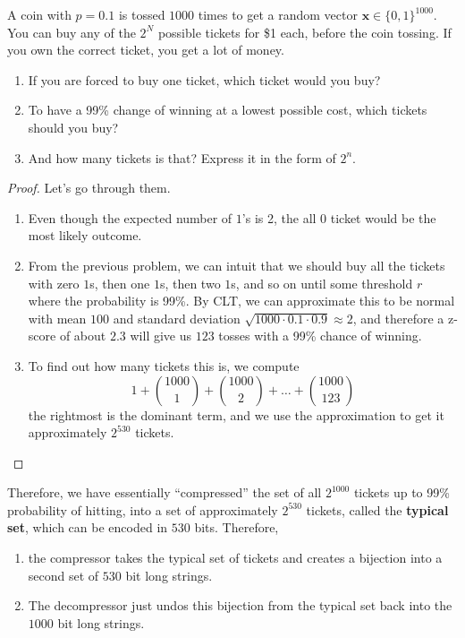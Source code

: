 \documentclass{article}
\begin{document}
    \begin{exercise}
      A coin with $p = 0.1$ is tossed $1000$ times to get a random vector $\mathbf{x} \in \{0, 1\}^{1000}$. You can buy any of the $2^N$ possible tickets for \$1 each, before the coin tossing. If you own the correct ticket, you get a lot of money. 
      \begin{enumerate}
        \item If you are forced to buy one ticket, which ticket would you buy? 
        \item To have a 99\% change of winning at a lowest possible cost, which tickets should you buy? 
        \item And how many tickets is that? Express it in the form of $2^n$. 
      \end{enumerate}
    \end{exercise}

    \begin{proof}
      Let's go through them. 
      \begin{enumerate}
        \item Even though the expected number of $1$'s is 2, the all $0$ ticket would be the most likely outcome. 
        \item From the previous problem, we can intuit that we should buy all the tickets with zero $1$s, then one $1$s, then two $1$s, and so on until some threshold $r$ where the probability is 99\%. By CLT, we can approximate this to be normal with mean $100$ and standard deviation $\sqrt{1000 \cdot 0.1 \cdot 0.9} \approx 2$, and therefore a z-score of about $2.3$ will give us $123$ tosses with a 99\% chance of winning. 
        \item To find out how many tickets this is, we compute 
          \begin{equation}
            1 + \binom{1000}{1} + \binom{1000}{2} + \ldots + \binom{1000}{123}
          \end{equation}
          the rightmost is the dominant term, and we use the approximation to get it approximately $2^{530}$ tickets.  
      \end{enumerate}
    \end{proof}

    Therefore, we have essentially ``compressed'' the set of all $2^{1000}$ tickets up to 99\% probability of hitting, into a set of approximately $2^{530}$ tickets, called the \textbf{typical set}, which can be encoded in $530$ bits. Therefore, 
    \begin{enumerate}
      \item the compressor takes the typical set of tickets and creates a bijection into a second set of $530$ bit long strings. 
      \item The decompressor just undos this bijection from the typical set back into the $1000$ bit long strings. 
    \end{enumerate}
\end{document}

